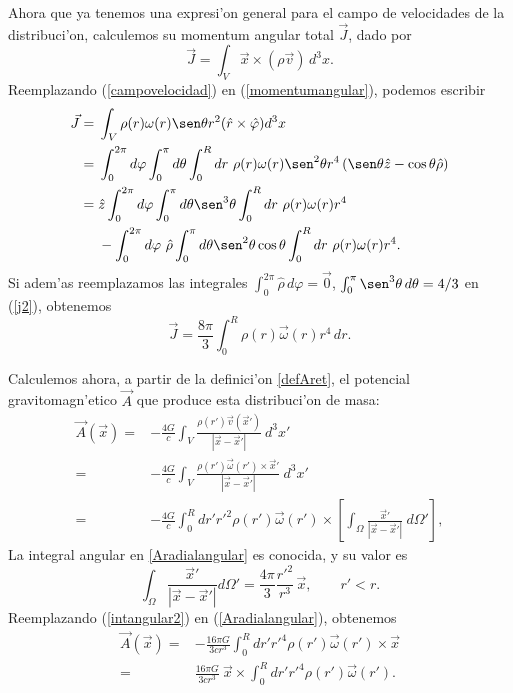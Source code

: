 Ahora que ya tenemos una expresi'on general para el campo de velocidades de la distribuci'on, calculemos su momentum angular total $\vec{J}$, dado por
\begin{equation}
\vec{J}=\int_V \vec{x}\times(\rho \vec{v})\,d^3x.\label{momentumangular}
\end{equation}
Reemplazando (\ref{campovelocidad}) en (\ref{momentumangular}), podemos escribir
\begin{align}
\vec{J}={}&\int_V \rho (r)\omega(r)\sen \theta r^2(\hat{r}\times\hat{\varphi })d^3x\\
 ={}&\int_0^{2\pi}d\varphi \int_0^{\pi}d\theta \int_0^{R}dr\ \rho (r)\omega(r)\sen^2 \theta r^4\left(\sen \theta \hat{z}-\cos \theta \hat{\rho}\right)\\
 ={}&\hat{z}\int_0^{2\pi}d\varphi \int_0^{\pi}d\theta \sen^3 \theta  \int_0^{R}dr\ \rho (r)\omega(r)r^4\nonumber\\
 {}&-\int_0^{2\pi}d\varphi \ \hat{\rho}\int_0^{\pi}d\theta \sen^2 \theta \cos \theta  \int_0^{R}dr\ \rho (r)\omega(r)r^4.\label{j2}
\end{align}
Si adem'as reemplazamos las integrales $\int_0^{2\pi}\hat{\rho}\,d\varphi =\vec{0}$, $\int_0^{\pi}\sen^3\theta\,d\theta  ={4}/{3}$ en (\ref{j2}), obtenemos
\begin{equation}\boxed{
\vec{J}=\frac{8\pi}{3}\int_0^{R}\rho (r)\vec{\omega}(r)r^4\, dr.}\label{jgeneral}
\end{equation}

Calculemos ahora, a partir de la definici'on \eqref{defAret}, el potencial gravitomagn'etico $\vec{A}$ que produce esta distribuci'on de masa:
\begin{align}
\vec{A}(\vec{x})={}&-\frac{4G}{c}\int_V \frac{\rho (r') \vec{v}(\vec{x}')}{|\vec{x}-\vec{x}'|}\ d^3x'\\
 ={}&-\frac{4G}{c}\int_V \frac{\rho (r') \vec{\omega}(r')\times\vec{x}'}{|\vec{x}-\vec{x}'|}\ d^3x'\\
 ={}&-\frac{4G}{c}\int_0^{R}dr'r'^2\rho (r')\vec{\omega}(r')\times\left[\int_{\Omega}\frac{\vec{x}'}{|\vec{x}-\vec{x}'|}\ d\Omega'\right],\label{Aradialangular}
\end{align}
La integral angular en \eqref{Aradialangular} es conocida, y su valor es
\begin{equation}
\int_{\Omega}\frac{\vec{x}'}{|\vec{x}-\vec{x}'|}d\Omega'=
\dfrac{4\pi}{3}\frac{r'^2}{r^3}\, \vec{x}, \qquad r'<r .\label{intangular2}
\end{equation}
Reemplazando (\ref{intangular2}) en (\ref{Aradialangular}), obtenemos
\begin{align}
\vec{A}(\vec{x})={}&-\frac{16\pi G}{3cr^3}\int_0^{R}dr'r'^4\rho (r')\vec{\omega}(r')\times\vec{x}\\
={}&\frac{16\pi G}{3cr^3}\ \vec{x}\times\int_0^{R}dr'r'^4\rho (r')\vec{\omega}(r').\label{Acasi}
\end{align}

